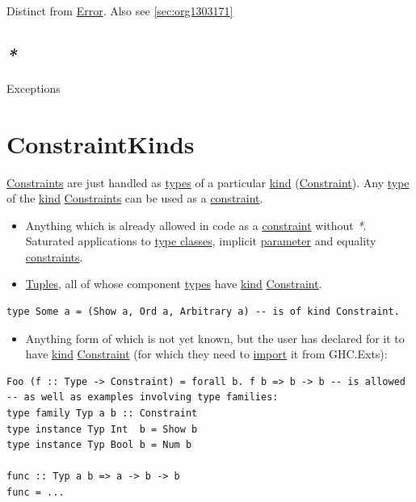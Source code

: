 \documentclass[a4paper,14pt,oneside]{book}
\begin{document}
Distinct from \hyperref[org6a0620d]{Error}. Also see \ref{sec:org1303171}

\section{\emph{*}}
\label{sec:org93a9257}

\label{org9a725c2}Exceptions

\chapter{\label{org0327a8e}ConstraintKinds}
\label{sec:org410805c}
\hyperref[org6d1b700]{Constraints} are just handled as \hyperref[org9a2726c]{types} of a particular \hyperref[org3f0fa05]{kind} (\hyperref[orgbf48c50]{Constraint}).
Any \hyperref[org8429d9d]{type} of the \hyperref[org3f0fa05]{kind} \hyperref[org6d1b700]{Constraints} can be used as a \hyperref[orgbf48c50]{constraint}.
\begin{itemize}
\item Anything which is already allowed in code as a \hyperref[orgbf48c50]{constraint} without \emph{*}. Saturated applications to \hyperref[org53fcbf8]{type classes}, implicit \hyperref[org38d97fd]{parameter} and equality \hyperref[org6d1b700]{constraints}.
\item \hyperref[org285f198]{Tuples}, all of whose component \hyperref[org9a2726c]{types} have \hyperref[org3f0fa05]{kind} \hyperref[orgbf48c50]{Constraint}.
\end{itemize}
\begin{verbatim}
type Some a = (Show a, Ord a, Arbitrary a) -- is of kind Constraint.
\end{verbatim}
\begin{itemize}
\item Anything form of which is not yet known, but the user has declared for it to have \hyperref[org3f0fa05]{kind} \hyperref[orgbf48c50]{Constraint} (for which they need to \hyperref[org27e7b94]{import} it from GHC.Exts):
\end{itemize}
\begin{verbatim}
Foo (f :: Type -> Constraint) = forall b. f b => b -> b -- is allowed
-- as well as examples involving type families:
type family Typ a b :: Constraint
type instance Typ Int  b = Show b
type instance Typ Bool b = Num b

func :: Typ a b => a -> b -> b
func = ...
\end{verbatim}
\end{document}
